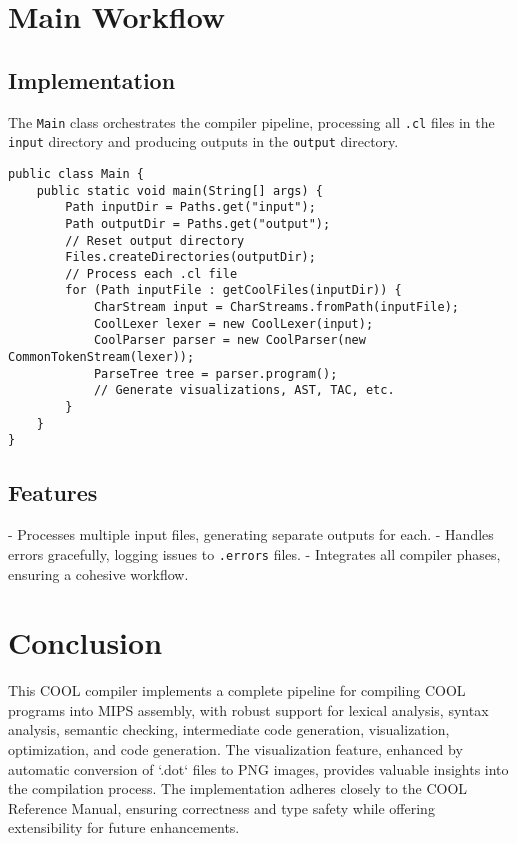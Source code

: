 \documentclass[titlepage]{article}
\begin{document}
\section{Main Workflow}

\subsection{Implementation}

The \texttt{Main} class orchestrates the compiler pipeline, processing all \texttt{.cl} files in the \texttt{input} directory and producing outputs in the \texttt{output} directory.

\begin{lstlisting}
public class Main {
    public static void main(String[] args) {
        Path inputDir = Paths.get("input");
        Path outputDir = Paths.get("output");
        // Reset output directory
        Files.createDirectories(outputDir);
        // Process each .cl file
        for (Path inputFile : getCoolFiles(inputDir)) {
            CharStream input = CharStreams.fromPath(inputFile);
            CoolLexer lexer = new CoolLexer(input);
            CoolParser parser = new CoolParser(new CommonTokenStream(lexer));
            ParseTree tree = parser.program();
            // Generate visualizations, AST, TAC, etc.
        }
    }
}
\end{lstlisting}

\subsection{Features}

- Processes multiple input files, generating separate outputs for each.
- Handles errors gracefully, logging issues to \texttt{.errors} files.
- Integrates all compiler phases, ensuring a cohesive workflow.

\section{Conclusion}

This COOL compiler implements a complete pipeline for compiling COOL programs into MIPS assembly, with robust support for lexical analysis, syntax analysis, semantic checking, intermediate code generation, visualization, optimization, and code generation. The visualization feature, enhanced by automatic conversion of `.dot` files to PNG images, provides valuable insights into the compilation process. The implementation adheres closely to the COOL Reference Manual, ensuring correctness and type safety while offering extensibility for future enhancements.
\end{document}
